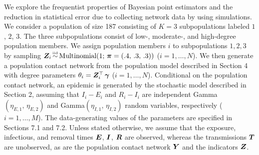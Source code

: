 We explore the frequentist properties of Bayesian point estimators and the reduction in statistical error due to collecting network data by using simulations.
We consider a population of size 187 consisting of $K = 3$ subpopulations labeled $1$, $2$, $3$.
The three subpopulations consist of low-, moderate-, and high-degree population members.
We assign population members $i$ to subpopulations $1, 2, 3$ by sampling $\bm{Z}_i \mathop{\rm \sim}\limits^{\mbox{\tiny iid}} \mbox{Multinomial}(1;\, \mbox{\boldmath$\pi$}=(.4,\, .3,\, .3))$ ($i = 1, \dots, N$).
We then generate a population contact network from the population model described in Section 4 with degree parameters $\theta_i = \bm{Z}_i^\top\, \mbox{\boldmath$\gamma$}$ ($i = 1, \dots, N$). 
Conditional on the population contact network,
an epidemic is generated by the stochastic model described in Section 2,
assuming that $I_i - E_i$ and $R_i - I_i$ are independent Gamma$(\eta_{E,1},\, \eta_{E,2})$ and Gamma$(\eta_{I,1},\, \eta_{I,2})$ random variables,
respectively ($i = 1, \dots, M$).
The data-generating values of the parameters are specified in Sections 7.1 and 7.2.
Unless stated otherwise,
we assume that the exposure, infectious, and removal times $\bm{E}$, $\bm{I}$, $\bm{R}$ are observed,
whereas the transmissions $\bm{T}$ are unobserved,
as are the population contact network $\bm{Y}$ and the indicators $\bm{Z}$.
